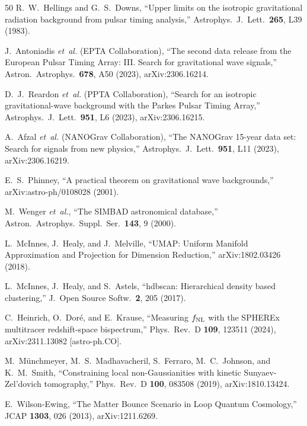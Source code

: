 \documentclass[aps,prd,twocolumn,superscriptaddress,showpacs,preprintnumbers,nofootinbib,longbibliography,floatfix]{revtex4-2}
\newcommand{\etal}{\textit{et~al.}}
\begin{document}
\begin{thebibliography}{50}
R.\ W.\ Hellings and G.\ S.\ Downs,
``Upper limits on the isotropic gravitational radiation background from pulsar timing analysis,''
Astrophys.\ J.\ Lett.\ \textbf{265}, L39 (1983).

J.\ Antoniadis \etal{} (EPTA Collaboration),
``The second data release from the European Pulsar Timing Array: III. Search for gravitational wave signals,''
Astron.\ Astrophys.\ \textbf{678}, A50 (2023), arXiv:2306.16214.

D.\ J.\ Reardon \etal{} (PPTA Collaboration),
``Search for an isotropic gravitational-wave background with the Parkes Pulsar Timing Array,''
Astrophys.\ J.\ Lett.\ \textbf{951}, L6 (2023), arXiv:2306.16215.

A.\ Afzal \etal{} (NANOGrav Collaboration),
``The NANOGrav 15-year data set: Search for signals from new physics,''
Astrophys.\ J.\ Lett.\ \textbf{951}, L11 (2023), arXiv:2306.16219.

E.\ S.\ Phinney,
``A practical theorem on gravitational wave backgrounds,''
arXiv:astro-ph/0108028 (2001).


M.\ Wenger \etal,
``The SIMBAD astronomical database,''
Astron.\ Astrophys.\ Suppl.\ Ser.\ \textbf{143}, 9 (2000).

L.\ McInnes, J.\ Healy, and J.\ Melville,
``UMAP: Uniform Manifold Approximation and Projection for Dimension Reduction,''
arXiv:1802.03426 (2018).

L.\ McInnes, J.\ Healy, and S.\ Astels,
``hdbscan: Hierarchical density based clustering,''
J.\ Open Source Softw.\ \textbf{2}, 205 (2017).


C.\ Heinrich, O.\ Dor\'e, and E.\ Krause,
``Measuring $f_{\rm NL}$ with the SPHEREx multitracer redshift-space bispectrum,''
Phys.\ Rev.\ D \textbf{109}, 123511 (2024), arXiv:2311.13082 [astro-ph.CO].

M.\ M{\"u}nchmeyer, M.\ S.\ Madhavacheril, S.\ Ferraro, M.\ C.\ Johnson, and K.\ M.\ Smith,
``Constraining local non-Gaussianities with kinetic Sunyaev-Zel'dovich tomography,''
Phys.\ Rev.\ D \textbf{100}, 083508 (2019), arXiv:1810.13424.

E.\ Wilson-Ewing,
``The Matter Bounce Scenario in Loop Quantum Cosmology,''
JCAP \textbf{1303}, 026 (2013), arXiv:1211.6269.


\end{thebibliography}
\end{document}
